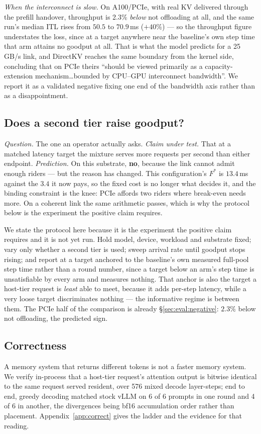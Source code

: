 \emph{When the interconnect is slow.} On A100/PCIe, with real KV delivered through
the prefill handover, throughput is 2.3\% \emph{below} not offloading at all, and
the same run's median ITL rises from $50.5$ to $70.9$\,ms ($+40\%$) --- so the
throughput figure understates the loss, since at a target anywhere near the
baseline's own step time that arm attains no goodput at all.
That is what the model predicts for a 25\,GB/s link, and DirectKV reaches the same
boundary from the kernel side, concluding that on PCIe theirs ``should be viewed
primarily as a capacity-extension mechanism\ldots bounded by CPU--GPU interconnect
bandwidth''. We report it as a validated negative fixing one end of the bandwidth
axis rather than as a disappointment.

\subsection{Does a second tier raise goodput?}
\label{sec:eval:goodput}

\emph{Question.} The one an operator actually asks. \emph{Claim under test.} That at
a matched latency target the mixture serves more requests per second than either
endpoint. \emph{Prediction.} On this substrate, \textbf{no}, because the link cannot
admit enough riders --- but the reason has changed. This configuration's $F^{*}$ is
$13.4$\,ms against the $3.4$ it now pays, so the fixed cost is no longer what
decides it, and the binding constraint is the knee: PCIe affords two riders where
break-even needs more. On a coherent link the same arithmetic passes, which is why
the protocol below is the experiment the positive claim requires.

We state the protocol here because it is the experiment the positive claim requires
and it is not yet run. Hold model, device, workload and substrate fixed; vary only
whether a second tier is used; sweep arrival rate until goodput stops rising; and
report at a target anchored to the baseline's own measured full-pool step time
rather than a round number, since a target below an arm's step time is
unsatisfiable by every arm and measures nothing. That anchor is also the target a
host-tier request is \emph{least} able to meet, because it adds per-step latency,
while a very loose target discriminates nothing --- the informative regime is
between them. The PCIe half of the comparison is already
\S\ref{sec:eval:negative}: $2.3\%$ below not offloading, the predicted sign.

\subsection{Correctness}
\label{sec:eval:correct}

A memory system that returns different tokens is not a faster memory system. We
verify in-process that a host-tier request's attention output is bitwise identical to
the same request served resident, over 576 mixed decode layer-steps; end to end,
greedy decoding matched stock vLLM on 6 of 6 prompts in one round and 4 of 6 in
another, the divergences being bf16 accumulation order rather than placement.
Appendix~\ref{app:correct} gives the ladder and the evidence for that reading.
